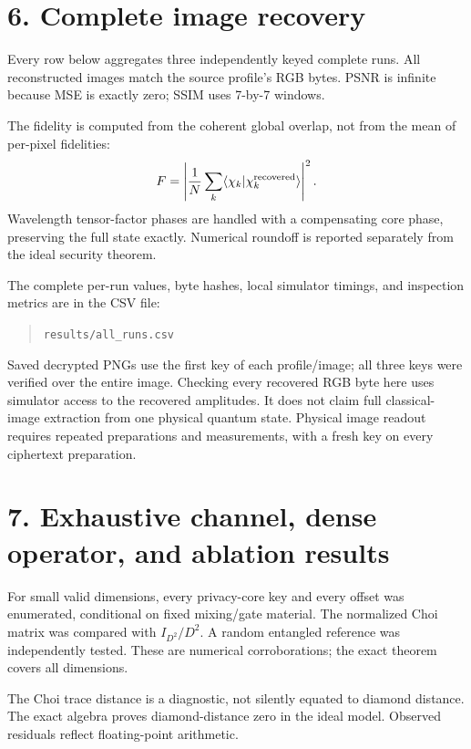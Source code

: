 \documentclass[11pt,a4paper]{article}
\begin{document}
\newpage
\section*{6. Complete image recovery}
Every row below aggregates three independently keyed complete runs. All reconstructed images match the source profile's RGB bytes. PSNR is infinite because MSE is exactly zero; SSIM uses 7-by-7 windows.



The fidelity is computed from the coherent global overlap, not from the mean of per-pixel fidelities:
\[
F=\left|\frac1N\sum_k
 \langle\chi_k|\chi_k^{\rm recovered}\rangle\right|^2.
\]
Wavelength tensor-factor phases are handled with a compensating core phase, preserving the full state exactly. Numerical roundoff is reported separately from the ideal security theorem.



The complete per-run values, byte hashes, local simulator timings, and inspection metrics are in the CSV file:
\begin{quote}\texttt{results/all\_runs.csv}\end{quote}
Saved decrypted PNGs use the first key of each profile/image; all three keys were verified over the entire image.
Checking every recovered RGB byte here uses simulator access to the recovered amplitudes. It does not claim full classical-image extraction from one physical quantum state. Physical image readout requires repeated preparations and measurements, with a fresh key on every ciphertext preparation.

\newpage
\section*{7. Exhaustive channel, dense operator, and ablation results}
For small valid dimensions, every privacy-core key and every offset was enumerated, conditional on fixed mixing/gate material. The normalized Choi matrix was compared with \(I_{D^2}/D^2\). A random entangled reference was independently tested. These are numerical corroborations; the exact theorem covers all dimensions.



The Choi trace distance is a diagnostic, not silently equated to diamond distance. The exact algebra proves diamond-distance zero in the ideal model. Observed residuals reflect floating-point arithmetic.
\end{document}
